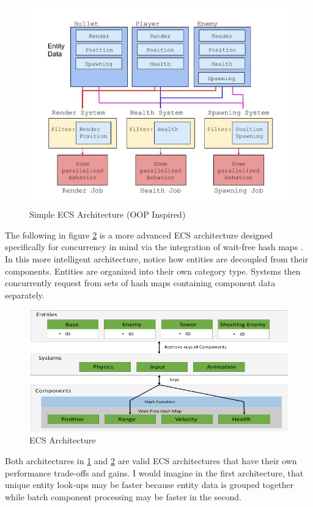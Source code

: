 \begin{figure}[H]
    \centering
    \includegraphics[width=0.7\linewidth]{resources/naive_ecs2.png}
    \caption{Simple ECS Architecture (OOP Inspired)}
    \label{fig:naive1}
\end{figure}


The following in figure \ref{fig:advanced2} is a more advanced ECS architecture designed specifically for concurrency in mind via the integration of wait-free hash maps \cite{waitfreemapsecs}. In this more intelligent architecture, notice how entities are decoupled from their components. Entities are organized into their own category type. Systems then concurrently request from sets of hash maps containing component data separately.

\begin{figure}[htbp]
    \centering
    \includegraphics[width=0.7\linewidth]{resources/ecs2.png}
    \caption{ECS Architecture}
    \label{fig:advanced2}
\end{figure}

Both architectures in \ref{fig:naive1} and \ref{fig:advanced2} are valid ECS architectures that have their own performance trade-offs and gains. I would imagine in the first architecture, that unique entity look-ups may be faster because entity data is grouped together while batch component processing may be faster in the second. 

